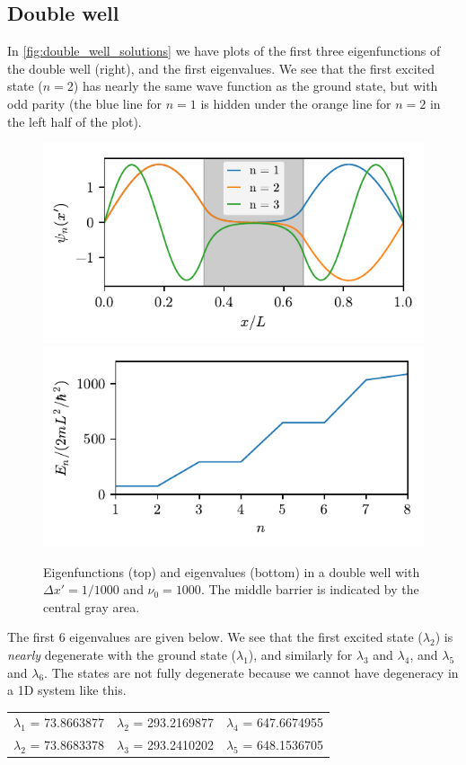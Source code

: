 \subsection*{Double well}
In \cref{fig:double_well_solutions} we have plots of the first three eigenfunctions of the double well (right), and the first eigenvalues. We see that the first excited state ($n=2$) has nearly the same wave function as the ground state, but with odd parity (the blue line for $n=1$ is hidden under the orange line for $n=2$ in the left half of the plot).
\begin{figure}[ht!]%
\centering%
\includegraphics{figs/double_eigenfunctions.pdf}\\%
\includegraphics{figs/double_eigenvalues.pdf}%
\caption{Eigenfunctions (top) and eigenvalues (bottom) in a double well with $\Delta x' = 1/1000$ and $\nu_0 = 1000$. The middle barrier is indicated by the central gray area. \label{fig:well_solutions}}%
\end{figure}

The first 6 eigenvalues are given below. We see that the first excited state ($\lambda_2$) is \emph{nearly} degenerate with the ground state ($\lambda_1$), and similarly for $\lambda_3$ and $\lambda_4$, and $\lambda_5$ and $\lambda_6$. The states are not fully degenerate because we cannot have degeneracy in a 1D system like this.
\begin{center}%
\begin{tabular}{ccc}%
$\lambda_1$ = 73.8663877 & $\lambda_2$ = 293.2169877 & $\lambda_4$ = 647.6674955 \\
$\lambda_2$ = 73.8683378 & $\lambda_3$ = 293.2410202 & $\lambda_5$ = 648.1536705
\end{tabular}%
\end{center}%


